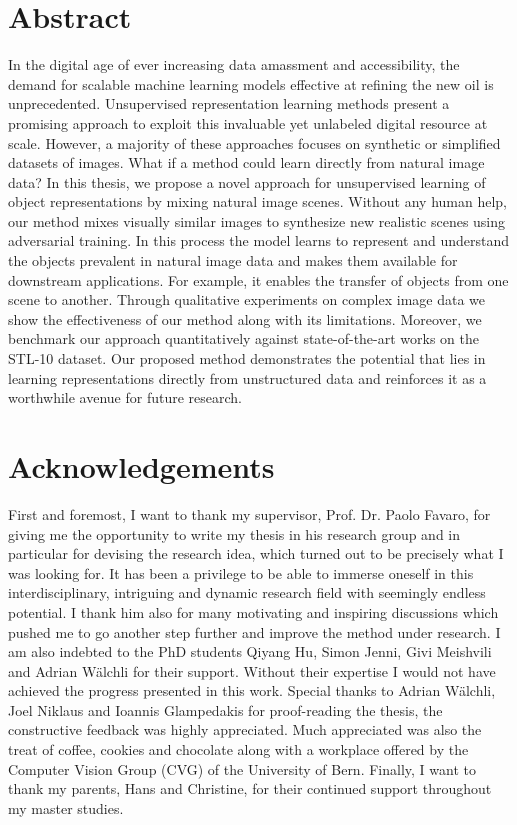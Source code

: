 \documentclass[a4paper,12pt]{report}
\begin{document}
\chapter*{Abstract}
In the digital age of ever increasing data amassment and accessibility, the demand for scalable machine learning models effective at refining the new oil is unprecedented. Unsupervised representation learning methods present a promising approach to exploit this invaluable yet unlabeled digital resource at scale. However, a majority of these approaches focuses on synthetic or simplified datasets of images. What if a method could learn directly from natural image data? In this thesis, we propose a novel approach for unsupervised learning of object representations by mixing natural image scenes. Without any human help, our method mixes visually similar images to synthesize new realistic scenes using adversarial training. In this process the model learns to represent and understand the objects prevalent in natural image data and makes them available for downstream applications. For example, it enables the transfer of objects from one scene to another. Through qualitative experiments on complex image data we show the effectiveness of our method along with its limitations. Moreover, we benchmark our approach quantitatively against state-of-the-art works on the STL-10 dataset. Our proposed method demonstrates the potential that lies in learning representations directly from unstructured data and reinforces it as a worthwhile avenue for future research.


\newpage
\chapter*{Acknowledgements}
First and foremost, I want to thank my supervisor, Prof. Dr. Paolo Favaro, for giving me the opportunity to write my thesis in his research group and in particular for devising the research idea, which turned out to be precisely what I was looking for. It has been a privilege to be able to immerse oneself in this interdisciplinary, intriguing and dynamic research field with seemingly endless potential. I thank him also for many motivating and inspiring discussions which pushed me to go another step further and improve the method under research. I am also indebted to the PhD students Qiyang Hu, Simon Jenni, Givi Meishvili and Adrian Wälchli for their support. Without their expertise I would not have achieved the progress presented in this work. Special thanks to Adrian Wälchli, Joel Niklaus and Ioannis Glampedakis for proof-reading the thesis, the constructive feedback was highly appreciated. Much appreciated was also the treat of coffee, cookies and chocolate along with a workplace offered by the Computer Vision Group (CVG) of the University of Bern. Finally, I want to thank my parents, Hans and Christine, for their continued support throughout my master studies.
\end{document}
